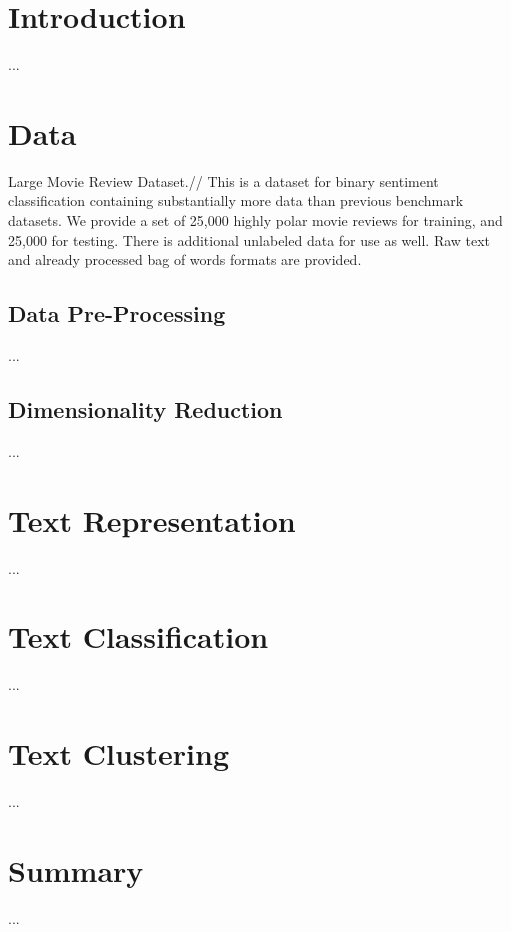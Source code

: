 \documentclass[fleqn,10pt]{SelfArx} %
\affiliation{\textbf{University}: University of Milano-Bicocca} %
\begin{document}
\maketitle %

\tableofcontents %

\thispagestyle{empty} %


\section{Introduction}
...

\section{Data}
Large Movie Review Dataset.//
This is a dataset for binary sentiment classification containing substantially more data than previous benchmark datasets. We provide a set of 25,000 highly polar movie reviews for training, and 25,000 for testing. There is additional unlabeled data for use as well. Raw text and already processed bag of words formats are provided.

\subsection{Data Pre-Processing}
...

\subsection{Dimensionality Reduction}
...

\section{Text Representation}
...

\section{Text Classification}
...

\section{Text Clustering}
...

\section{Summary}
...


\nocite{*}
\printbibliography
\end{document}
